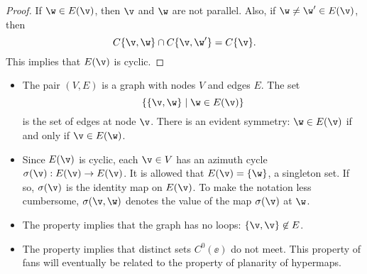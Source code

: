 \begin{proof}  If $\w\in E(\v)$, then $\v$ and $\w$ are not parallel.
Also, if $\w\ne \w'\in E(\v)$, then
\begin{displaymath}
C\{\v,\w\}\cap C\{\v,\w'\} = C\{\v\}.
\end{displaymath}
This implies that $E(\v)$ is cyclic.
\end{proof}

\begin{remark}\label{rem:fan}
\begin{itemize}
\item The pair $(V,E)$ is a graph with nodes $V$ and edges $E$.  The set
\begin{displaymath}\{\{\v,\w\}\mid \w\in E(\v)\}\end{displaymath} is
the set of edges at node $\v$.  There is an evident symmetry: $\w\in
E(\v)$ if and only if $\v\in E(\w)$.
%
\item
Since $E(\v)$ is cyclic,
each $\v\in V$ has an azimuth cycle $\sigma(\v):E(\v)\to E(\v)$.
It is allowed that $E(\v) = \{\w\}$,  a
%
singleton set. If so,
$\sigma(\v)$ is the identity map on $E(\v)$.
%
To make the notation less cumbersome, $\sigma(\v,\w)$ denotes the
value of the map $\sigma(\v)$ at $\w$.
%
\item The property  implies that the graph has no
loops: $\{\v,\v\}\not\in E$.
%
\item The property  implies that distinct sets
$C^0(\ee)$ do not meet.  This property of fans will eventually be
related to the property of planarity of hypermaps.
%
%
%
%
\end{itemize}
\end{remark}

